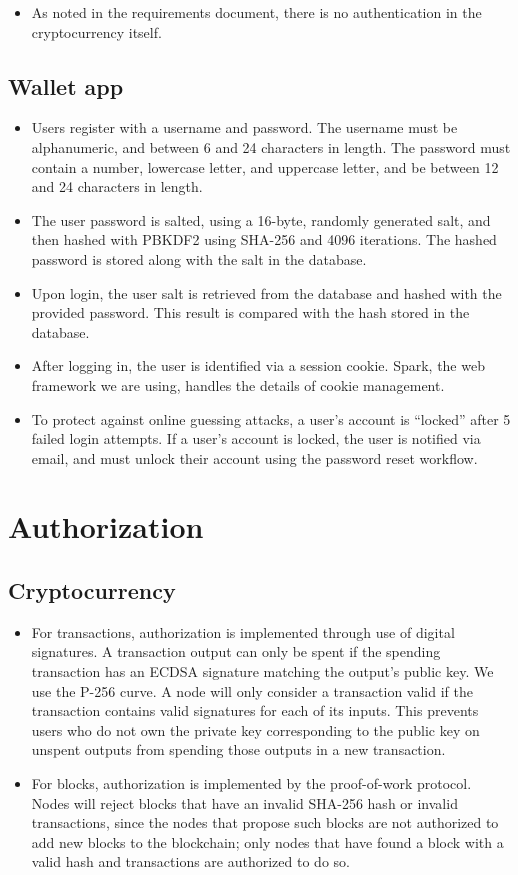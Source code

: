 \documentclass[a4paper,12pt]{article}
\begin{document}
\begin{itemize}
\item As noted in the requirements document, there is no authentication in the cryptocurrency itself.
\end{itemize}

\subsection{Wallet app}

\begin{itemize}
\item Users register with a username and password. The username must be alphanumeric, and between 6 and 24 characters in length.
The password must contain a number, lowercase letter, and uppercase letter, and be between 12 and 24 characters in length.
\item The user password is salted, using a 16-byte, randomly generated salt, and then hashed with PBKDF2 using SHA-256 and 4096 iterations.
The hashed password is stored along with the salt in the database.
\item Upon login, the user salt is retrieved from the database and hashed with the provided password.
This result is compared with the hash stored in the database.
\item After logging in, the user is identified via a session cookie.
Spark, the web framework we are using, handles the details of cookie management.
\item To protect against online guessing attacks, a user's account is ``locked'' after 5 failed login attempts.
If a user's account is locked, the user is notified via email, and must unlock their account using the password reset workflow.
\end{itemize}


\section{Authorization}
\subsection{Cryptocurrency}
\begin{itemize}
\item For transactions, authorization is implemented through use of digital signatures.
A transaction output can only be spent if the spending transaction has an ECDSA signature matching the output's public key.
We use the P-256 curve.
A node will only consider a transaction valid if the transaction contains valid signatures for each of its inputs.
This prevents users who do not own the private key corresponding to the public key on unspent outputs from spending those outputs in a new transaction.
\item For blocks, authorization is implemented by the proof-of-work protocol.
Nodes will reject blocks that have an invalid SHA-256 hash or invalid transactions, since the nodes that propose such blocks are not authorized to add new blocks to the blockchain; only nodes that have found a block with a valid hash and transactions are authorized to do so.
\end{itemize}
\end{document}
